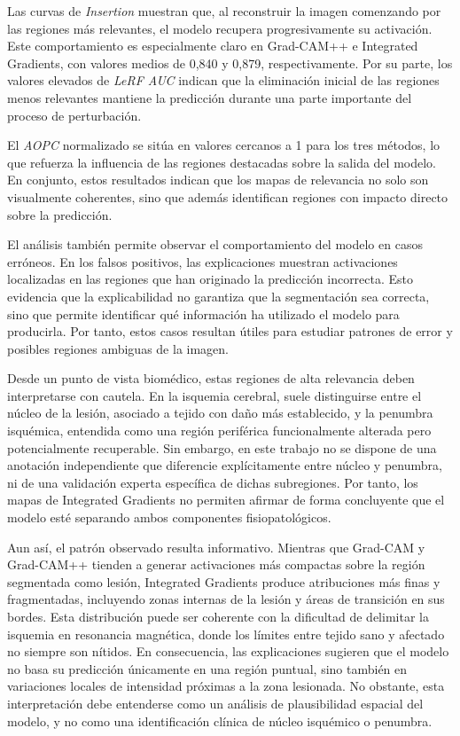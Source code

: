 Las curvas de \textit{Insertion} muestran que, al reconstruir la imagen comenzando por las regiones más relevantes, el modelo recupera progresivamente su activación. Este comportamiento es especialmente claro en Grad-CAM++ e Integrated Gradients, con valores medios de 0,840 y 0,879, respectivamente. Por su parte, los valores elevados de \textit{LeRF AUC} indican que la eliminación inicial de las regiones menos relevantes mantiene la predicción durante una parte importante del proceso de perturbación.

El \textit{AOPC} normalizado se sitúa en valores cercanos a 1 para los tres métodos, lo que refuerza la influencia de las regiones destacadas sobre la salida del modelo. En conjunto, estos resultados indican que los mapas de relevancia no solo son visualmente coherentes, sino que además identifican regiones con impacto directo sobre la predicción.

El análisis también permite observar el comportamiento del modelo en casos erróneos. En los falsos positivos, las explicaciones muestran activaciones localizadas en las regiones que han originado la predicción incorrecta. Esto evidencia que la explicabilidad no garantiza que la segmentación sea correcta, sino que permite identificar qué información ha utilizado el modelo para producirla. Por tanto, estos casos resultan útiles para estudiar patrones de error y posibles regiones ambiguas de la imagen.

Desde un punto de vista biomédico, estas regiones de alta relevancia deben interpretarse con cautela. En la isquemia cerebral, suele distinguirse entre el núcleo de la lesión, asociado a tejido con daño más establecido, y la penumbra isquémica, entendida como una región periférica funcionalmente alterada pero potencialmente recuperable. Sin embargo, en este trabajo no se dispone de una anotación independiente que diferencie explícitamente entre núcleo y penumbra, ni de una validación experta específica de dichas subregiones. Por tanto, los mapas de Integrated Gradients no permiten afirmar de forma concluyente que el modelo esté separando ambos componentes fisiopatológicos. \citep{astrup1981penumbra}

Aun así, el patrón observado resulta informativo. Mientras que Grad-CAM y Grad-CAM++ tienden a generar activaciones más compactas sobre la región segmentada como lesión, Integrated Gradients produce atribuciones más finas y fragmentadas, incluyendo zonas internas de la lesión y áreas de transición en sus bordes. Esta distribución puede ser coherente con la dificultad de delimitar la isquemia en resonancia magnética, donde los límites entre tejido sano y afectado no siempre son nítidos. En consecuencia, las explicaciones sugieren que el modelo no basa su predicción únicamente en una región puntual, sino también en variaciones locales de intensidad próximas a la zona lesionada. No obstante, esta interpretación debe entenderse como un análisis de plausibilidad espacial del modelo, y no como una identificación clínica de núcleo isquémico o penumbra.

